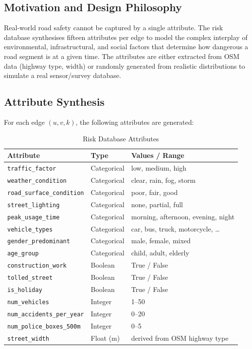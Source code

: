 ﻿\documentclass[a4paper, 12pt]{article}
\theoremstyle{remark}
\begin{document}
\subsection{Motivation and Design Philosophy}

Real-world road safety cannot be captured by a single attribute. The risk database synthesises fifteen attributes per edge to model the complex interplay of environmental, infrastructural, and social factors that determine how dangerous a road segment is at a given time. The attributes are either extracted from OSM data (highway type, width) or randomly generated from realistic distributions to simulate a real sensor/survey database.

\subsection{Attribute Synthesis}

For each edge $(u, v, k)$, the following attributes are generated:

\begin{table}[h!]
\centering
\caption{Risk Database Attributes}
\label{tab:risk_attrs}
\begin{tabular}{lll}
\toprule
\textbf{Attribute} & \textbf{Type} & \textbf{Values / Range} \\
\midrule
\texttt{traffic\_factor}        & Categorical & low, medium, high \\
\texttt{weather\_condition}     & Categorical & clear, rain, fog, storm \\
\texttt{road\_surface\_condition} & Categorical & poor, fair, good \\
\texttt{street\_lighting}       & Categorical & none, partial, full \\
\texttt{peak\_usage\_time}      & Categorical & morning, afternoon, evening, night \\
\texttt{vehicle\_types}         & Categorical & car, bus, truck, motorcycle, \ldots \\
\texttt{gender\_predominant}    & Categorical & male, female, mixed \\
\texttt{age\_group}             & Categorical & child, adult, elderly \\
\texttt{construction\_work}     & Boolean     & True / False \\
\texttt{tolled\_street}         & Boolean     & True / False \\
\texttt{is\_holiday}            & Boolean     & True / False \\
\texttt{num\_vehicles}          & Integer     & 1--50 \\
\texttt{num\_accidents\_per\_year} & Integer  & 0--20 \\
\texttt{num\_police\_boxes\_500m} & Integer   & 0--5 \\
\texttt{street\_width}          & Float (m)   & derived from OSM highway type \\
\bottomrule
\end{tabular}
\end{table}
\end{document}
